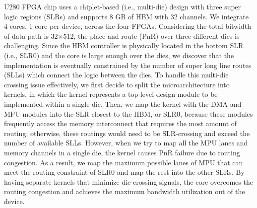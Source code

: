 U280 FPGA chip uses a chiplet-based (i.e., multi-die) design with three super logic regions (SLRs) and supports 8 GB of HBM with 32 channels. We integrate 4 \sysname{} cores, 1 core per device, across the four FPGAs. 
Considering the total bitwidth of data path is 32$\times$512, the place-and-route (PnR) over three different dies is challenging. Since the HBM controller is physically located in the bottom SLR (i.e., SLR0) and the \sysname{} core is large enough over the dies, we discover that the implementation is eventually constrained by the number of super long line routes (SLLs) which connect the logic between the dies.
To handle this multi-die crossing issue effectively, we first decide to split the \sysname{} microarchitecture into kernels, in which the kernel represents a top-level design module to be implemented within a single die.
Then, we map the kernel with the DMA and MPU modules into the SLR closest to the HBM, or SLR0, because these modules frequently access the memory interconnect that requires the most amount of routing; otherwise, these routings would need to be SLR-crossing and exceed the number of available SLLs. However, when we try to map all the MPU lanes and memory channels in a single die, the kernel causes PnR failure due to routing congestion. 
As a result, we map the maximum possible lanes of MPU that can meet the routing constraint of SLR0 and map the rest into the other SLRs. 
By having separate kernels that minimize die-crossing signals, the \sysname{} core overcomes the routing congestion and achieves the maximum bandwidth utilization out of the device. 



